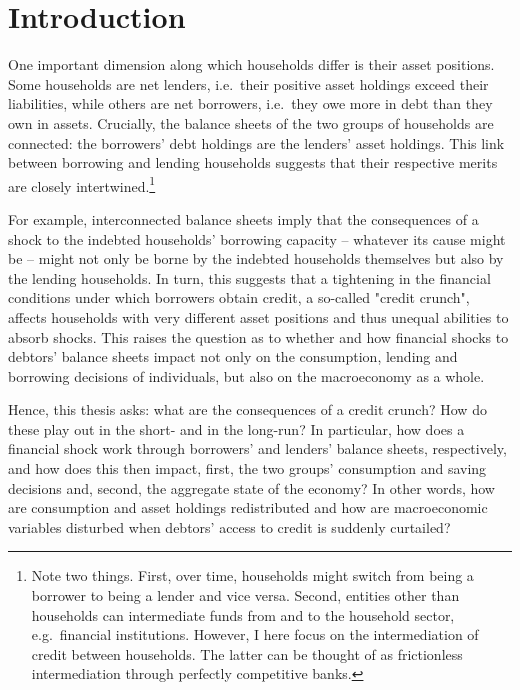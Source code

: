\documentclass[12pt]{article} %
\numberwithin{equation}{section} %
\numberwithin{figure}{section}
\numberwithin{table}{section}
\begin{document}
\thispagestyle{plain}
\section{Introduction}
\label{sec:introduction}

One important dimension along which households differ is their asset positions. Some households are net lenders, i.e.~their positive asset holdings exceed their liabilities, while others are net borrowers, i.e.~they owe more in debt than they own in assets. Crucially, the balance sheets of the two groups of households are connected: the borrowers' debt holdings are the lenders' asset holdings. This link between borrowing and lending households suggests that their respective merits are closely intertwined.\footnote{Note two things. First, over time, households might switch from being a borrower to being a lender and vice versa. Second, entities other than households can intermediate funds from and to the household sector, e.g.~financial institutions. However, I here focus on the intermediation of credit between households. The latter can be thought of as frictionless intermediation through perfectly competitive banks.} 

For example, interconnected balance sheets imply that the consequences of a shock to the indebted households' borrowing capacity -- whatever its cause might be -- might not only be borne by the indebted households themselves but also by the lending households. In turn, this suggests that a tightening in the financial conditions under which borrowers obtain credit, a so-called "credit crunch", affects households with very different asset positions and thus unequal abilities to absorb shocks. This raises the question as to whether and how financial shocks to debtors' balance sheets impact not only on the consumption, lending and borrowing decisions of individuals, but also on the macroeconomy as a whole. 

Hence, this thesis asks: what are the consequences of a credit crunch? How do these play out in the short- and in the long-run? In particular, how does a financial shock work through borrowers' and lenders' balance sheets, respectively, and how does this then impact, first, the two groups' consumption and saving decisions and, second, the aggregate state of the economy? In other words, how are consumption and asset holdings redistributed and how are macroeconomic variables disturbed when debtors' access to credit is suddenly curtailed?
\end{document}
